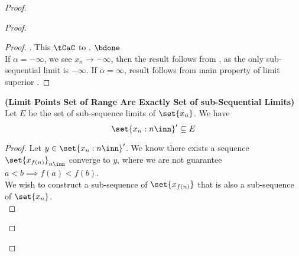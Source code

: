 \documentclass{report}
\begin{document}
\begin{proof}
\begin{proof}
\begin{proof}
. This $\tCaC$ to . $\bdone$\\

If $\alpha =-\infty$, we see $x_n\to -\infty$, then the result follows from , as the only sub-sequential limit is $-\infty$. If $\alpha =\infty$, result follows from main property of limit superior .
\end{proof}
\begin{theorem}
\label{4.4.11}
\textbf{(Limit Points Set of Range Are Exactly Set of sub-Sequential Limits)} Let $E$ be the set of sub-sequence limits of  $\set{x_n}$. We have
\begin{equation*}
\set{x_n:n\inn}'\subseteq E
\end{equation*}
\end{theorem}
\begin{proof}
Let $y\in \set{x_n:n\inn}'$. We know there exists a sequence $\set{x_{f(n)}}_{n\inn}$ converge to $y$, where we are not guarantee $a<b\implies f(a)<f(b)$.\\

We wish to construct a sub-sequence of $\set{x_{f(n)}}$ that is also a sub-sequence of $\set{x_n}$.\\


\end{proof}
\end{proof}
\end{proof}
\end{document}
